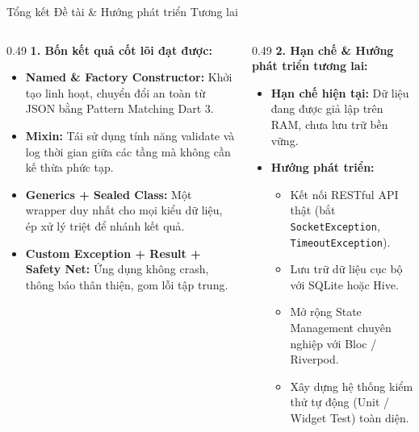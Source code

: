 \documentclass[aspectratio=169, 10pt]{beamer}
\begin{document}
\begin{frame}{Tổng kết Đề tài \& Hướng phát triển Tương lai}
  \vspace{-0.15cm}
  \begin{columns}[t,onlytextwidth]
    \begin{column}{0.49\textwidth}
      \textbf{1. Bốn kết quả cốt lõi đạt được:}
      \begin{itemize}
        \item \textbf{Named \& Factory Constructor:} Khởi tạo linh hoạt, chuyển đổi an toàn từ JSON bằng Pattern Matching Dart 3.
        \item \textbf{Mixin:} Tái sử dụng tính năng validate và log thời gian giữa các tầng mà không cần kế thừa phức tạp.
        \item \textbf{Generics + Sealed Class:} Một wrapper duy nhất cho mọi kiểu dữ liệu, ép xử lý triệt để nhánh kết quả.
        \item \textbf{Custom Exception + Result + Safety Net:} Ứng dụng không crash, thông báo thân thiện, gom lỗi tập trung.
      \end{itemize}
    \end{column}

    \begin{column}{0.49\textwidth}
      \textbf{2. Hạn chế \& Hướng phát triển tương lai:}
      \begin{itemize}
        \item \textbf{Hạn chế hiện tại:} Dữ liệu đang được giả lập trên RAM, chưa lưu trữ bền vững.
        \item \textbf{Hướng phát triển:}
          \begin{itemize}
            \item Kết nối RESTful API thật (bắt \texttt{SocketException}, \texttt{TimeoutException}).
            \item Lưu trữ dữ liệu cục bộ với SQLite hoặc Hive.
            \item Mở rộng State Management chuyên nghiệp với Bloc / Riverpod.
            \item Xây dựng hệ thống kiểm thử tự động (Unit / Widget Test) toàn diện.
          \end{itemize}
      \end{itemize}
    \end{column}
  \end{columns}
\end{frame}
\end{document}
